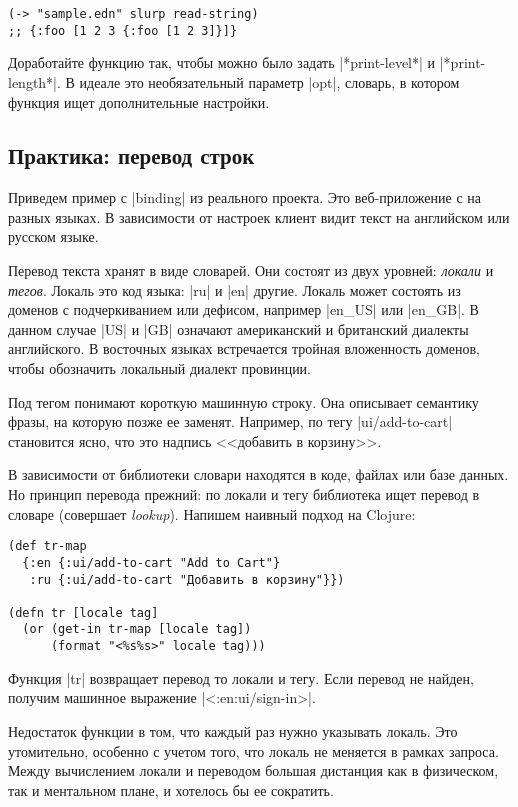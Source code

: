 \begin{verbatim}
(-> "sample.edn" slurp read-string)
;; {:foo [1 2 3 {:foo [1 2 3]}]}
\end{verbatim}

Доработайте функцию так, чтобы можно было задать \spverb|*print-level*| и
\spverb|*print-length*|. В идеале это необязательный параметр \spverb|opt|,
словарь, в котором функция ищет дополнительные настройки.

\subsection{Практика: перевод строк}

Приведем пример с \spverb|binding| из реального проекта. Это веб-приложение с на
разных языках. В зависимости от настроек клиент видит текст на английском или
русском языке.


Перевод текста хранят в виде словарей. Они состоят из двух уровней:
\emph{локали} и \emph{тегов}. Локаль это код языка: \spverb|ru| и \spverb|en|
другие. Локаль может состоять из доменов с подчеркиванием или дефисом, например
\spverb|en_US| или \spverb|en_GB|. В данном случае \spverb|US| и \spverb|GB|
означают американский и британский диалекты английского. В восточных языках
встречается тройная вложенность доменов, чтобы обозначить локальный диалект
провинции.

Под тегом понимают короткую машинную строку. Она описывает семантику фразы, на
которую позже ее заменят. Например, по тегу \spverb|ui/add-to-cart| становится
ясно, что это надпись <<добавить в корзину>>.

В зависимости от библиотеки словари находятся в коде, файлах или базе данных. Но
принцип перевода прежний: по локали и тегу библиотека ищет перевод в словаре
(совершает \emph{lookup}). Напишем наивный подход на Clojure:

\begin{verbatim}
(def tr-map
  {:en {:ui/add-to-cart "Add to Cart"}
   :ru {:ui/add-to-cart "Добавить в корзину"}})

(defn tr [locale tag]
  (or (get-in tr-map [locale tag])
      (format "<%s%s>" locale tag)))
\end{verbatim}

Функция \spverb|tr| возвращает перевод то локали и тегу. Если перевод не найден,
получим машинное выражение \spverb|<:en:ui/sign-in>|.

Недостаток функции в том, что каждый раз нужно указывать локаль. Это
утомительно, особенно с учетом того, что локаль не меняется в рамках
запроса. Между вычислением локали и переводом большая дистанция как в
физическом, так и ментальном плане, и хотелось бы ее сократить.

